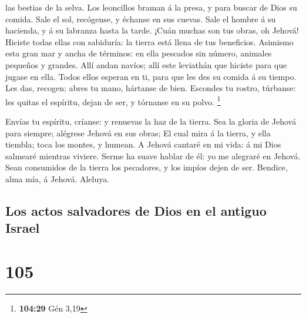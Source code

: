 las bestias de la selva.  Los leoncillos braman á la presa,
y para buscar de Dios su comida.  Sale el sol, recógense, y
échanse en sus cuevas.  Sale el hombre á su hacienda, y á
su labranza hasta la tarde.  ¡Cuán muchas son tus obras, oh
Jehová! Hiciste todas ellas con sabiduría: la tierra está llena de tus
beneficios.  Asimismo esta gran mar y ancha de términos: en
ella pescados sin número, animales pequeños y grandes. 
Allí andan navíos; allí este leviathán que hiciste para que jugase en
ella.  Todos ellos esperan en ti, para que les des su
comida á su tiempo.  Les das, recogen; abres tu mano,
hártanse de bien.  Escondes tu rostro, túrbanse: les quitas
el espíritu, dejan de ser, y tórnanse en su polvo. \footnote{\textbf{104:29}
  Gén 3,19}

 Envías tu espíritu, críanse: y renuevas la haz de la
tierra.  Sea la gloria de Jehová para siempre; alégrese
Jehová en sus obras;  El cual mira á la tierra, y ella
tiembla; toca los montes, y humean.  A Jehová cantaré en mi
vida: á mi Dios salmearé mientras viviere.  Serme ha suave
hablar de él: yo me alegraré en Jehová.  Sean consumidos de
la tierra los pecadores, y los impíos dejen de ser. Bendice, alma mía, á
Jehová. Aleluya.

\hypertarget{los-actos-salvadores-de-dios-en-el-antiguo-israel}{%
\subsection{Los actos salvadores de Dios en el antiguo
Israel}\label{los-actos-salvadores-de-dios-en-el-antiguo-israel}}

\hypertarget{section-104}{%
\section{105}\label{section-104}}

